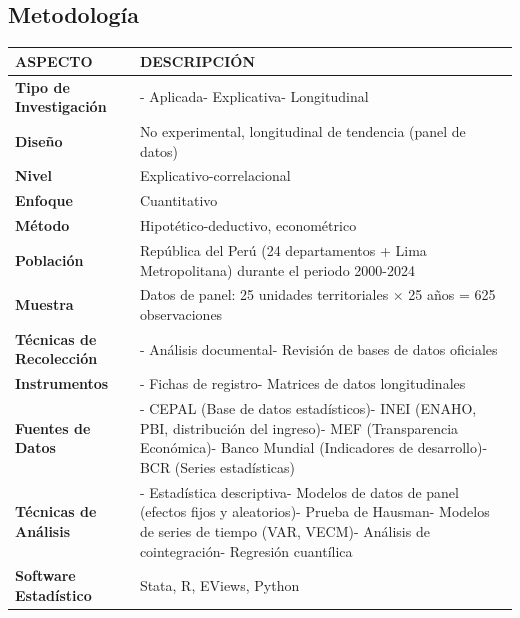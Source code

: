 \documentclass[
  man,
  floatsintext,
  longtable,
  a4paper,
  nolmodern,
  notxfonts,
  notimes,
  12pt,
  colorlinks=true,linkcolor=blue,citecolor=blue,urlcolor=blue]{apa7}
\newcounter{none} %
\begin{document}
\subsection{Metodología}\label{metodologuxeda-1}

{\def\LTcaptype{none} %
\begin{longtable}[]{@{}
  >{\raggedright\arraybackslash}p{}
  >{\raggedright\arraybackslash}p{}@{}}
\toprule\noalign{}
\begin{minipage}[b]{\linewidth}\raggedright
ASPECTO
\end{minipage} & \begin{minipage}[b]{\linewidth}\raggedright
DESCRIPCIÓN
\end{minipage} \\
\midrule\noalign{}
\endhead
\bottomrule\noalign{}
\endlastfoot
\textbf{Tipo de Investigación} & - Aplicada- Explicativa-
Longitudinal \\
\textbf{Diseño} & No experimental, longitudinal de tendencia (panel de
datos) \\
\textbf{Nivel} & Explicativo-correlacional \\
\textbf{Enfoque} & Cuantitativo \\
\textbf{Método} & Hipotético-deductivo, econométrico \\
\textbf{Población} & República del Perú (24 departamentos + Lima
Metropolitana) durante el periodo 2000-2024 \\
\textbf{Muestra} & Datos de panel: 25 unidades territoriales × 25 años =
625 observaciones \\
\textbf{Técnicas de Recolección} & - Análisis documental- Revisión de
bases de datos oficiales \\
\textbf{Instrumentos} & - Fichas de registro- Matrices de datos
longitudinales \\
\textbf{Fuentes de Datos} & - CEPAL (Base de datos estadísticos)- INEI
(ENAHO, PBI, distribución del ingreso)- MEF (Transparencia Económica)-
Banco Mundial (Indicadores de desarrollo)- BCR (Series estadísticas) \\
\textbf{Técnicas de Análisis} & - Estadística descriptiva- Modelos de
datos de panel (efectos fijos y aleatorios)- Prueba de Hausman- Modelos
de series de tiempo (VAR, VECM)- Análisis de cointegración- Regresión
cuantílica \\
\textbf{Software Estadístico} & Stata, R, EViews, Python \\
\end{longtable}
}
\end{document}

